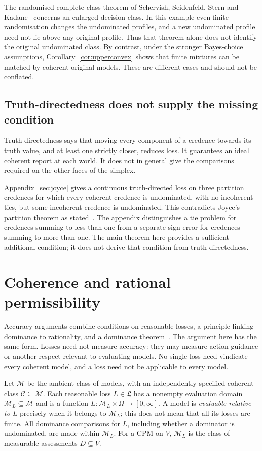 \documentclass[11pt]{article}
\theoremstyle{definition}
\theoremstyle{remark}
\newcommand{\M}{\mathcal M}
\newcommand{\C}{\mathcal C}
\begin{document}
The randomised complete-class theorem of Schervish, Seidenfeld, Stern and Kadane~\cite[Theorem~1]{SSSK} concerns an enlarged decision class. In this example even finite randomisation changes the undominated profiles, and a new undominated profile need not lie above any original profile. Thus that theorem alone does not identify the original undominated class. By contrast, under the stronger Bayes-choice assumptions, Corollary~\ref{cor:upperconvex} shows that finite mixtures can be matched by coherent original models. These are different cases and should not be conflated.

\subsection{Truth-directedness does not supply the missing condition}
Truth-directedness says that moving every component of a credence towards its truth value, and at least one strictly closer, reduces loss. It guarantees an ideal coherent report at each world. It does not in general give the comparisons required on the other faces of the simplex.

Appendix~\ref{sec:joyce} gives a continuous truth-directed loss on three partition credences for which every coherent credence is undominated, with no incoherent ties, but some incoherent credence is undominated. This contradicts Joyce's partition theorem as stated~\cite[Theorem~2]{Joyce}. The appendix distinguishes a tie problem for credences summing to less than one from a separate sign error for credences summing to more than one. The main theorem here provides a sufficient additional condition; it does not derive that condition from truth-directedness.

\section{Coherence and rational permissibility}\label{sec:argument}
Accuracy arguments combine conditions on reasonable losses, a principle linking dominance to rationality, and a dominance theorem~\cite{Joyce,Pettigrew}. The argument here has the same form. Losses need not measure accuracy: they may measure action guidance or another respect relevant to evaluating models. No single loss need vindicate every coherent model, and a loss need not be applicable to every model.

Let $\M$ be the ambient class of models, with an independently specified coherent class $\C\subseteq\M$. Each reasonable loss $L\in\mathfrak L$ has a nonempty evaluation domain $\M_L\subseteq\M$ and is a function $L:\M_L\times\Omega\to[0,\infty]$. A model is \emph{evaluable relative to $L$} precisely when it belongs to $\M_L$; this does not mean that all its losses are finite. All dominance comparisons for $L$, including whether a dominator is undominated, are made within $\M_L$. For a CPM on $V$, $\M_L$ is the class of measurable assessments $D\subseteq V$.
\end{document}
